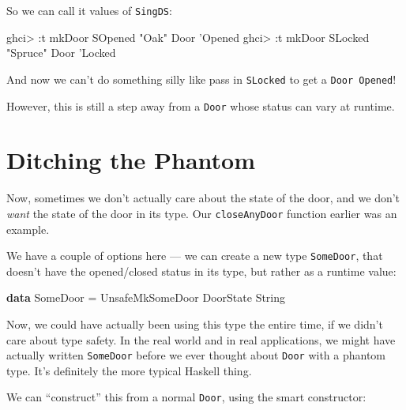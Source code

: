\documentclass[]{article}
\newenvironment{Shaded}{}{}
\newcommand{\KeywordTok}[1]{\textcolor[rgb]{0.00,0.44,0.13}{\textbf{#1}}}
\newcommand{\DataTypeTok}[1]{\textcolor[rgb]{0.56,0.13,0.00}{#1}}
\newcommand{\CharTok}[1]{\textcolor[rgb]{0.25,0.44,0.63}{#1}}
\newcommand{\StringTok}[1]{\textcolor[rgb]{0.25,0.44,0.63}{#1}}
\newcommand{\FunctionTok}[1]{\textcolor[rgb]{0.02,0.16,0.49}{#1}}
\newcommand{\NormalTok}[1]{#1}
\begin{document}
So we can call it values of \texttt{SingDS}:

\begin{Shaded}
\begin{Highlighting}[]
\NormalTok{ghci}\FunctionTok{>} \FunctionTok{:}\NormalTok{t mkDoor }\DataTypeTok{SOpened} \StringTok{"Oak"}
\DataTypeTok{Door} \CharTok{'Opened}
\NormalTok{ghci}\FunctionTok{>} \FunctionTok{:}\NormalTok{t mkDoor }\DataTypeTok{SLocked} \StringTok{"Spruce"}
\DataTypeTok{Door} \CharTok{'Locked}
\end{Highlighting}
\end{Shaded}

And now we can't do something silly like pass in \texttt{SLocked} to get a
\texttt{Door\ \textquotesingle{}Opened}!

However, this is still a step away from a \texttt{Door} whose status can vary at
runtime.

\section{Ditching the Phantom}\label{ditching-the-phantom}

Now, sometimes we don't actually care about the state of the door, and we don't
\emph{want} the state of the door in its type. Our \texttt{closeAnyDoor}
function earlier was an example.

We have a couple of options here --- we can create a new type \texttt{SomeDoor},
that doesn't have the opened/closed status in its type, but rather as a runtime
value:

\begin{Shaded}
\begin{Highlighting}[]
\KeywordTok{data} \DataTypeTok{SomeDoor} \FunctionTok{=} \DataTypeTok{UnsafeMkSomeDoor} \DataTypeTok{DoorState} \DataTypeTok{String}
\end{Highlighting}
\end{Shaded}

Now, we could have actually been using this type the entire time, if we didn't
care about type safety. In the real world and in real applications, we might
have actually written \texttt{SomeDoor} before we ever thought about
\texttt{Door} with a phantom type. It's definitely the more typical Haskell
thing.

We can ``construct'' this from a normal \texttt{Door}, using the smart
constructor:
\end{document}
